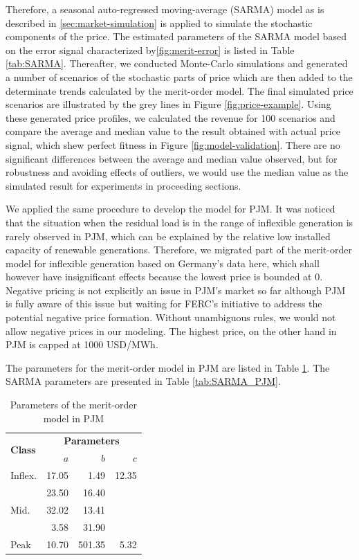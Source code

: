 Therefore, a seasonal auto-regressed moving-average (SARMA) model as is described in \ref{sec:market-simulation} is applied to simulate the stochastic components of the price. The estimated parameters of the SARMA model based on the error signal characterized by\ref{fig:merit-error} is listed in Table \ref{tab:SARMA}. Thereafter, we conducted Monte-Carlo simulations and generated a number of scenarios of the stochastic parts of price which are then added to the determinate trends calculated by the merit-order model. The final simulated price scenarios are illustrated by the grey lines in Figure \ref{fig:price-example}. Using these generated price profiles, we calculated the revenue for 100 scenarios and compare the average and median value to the result obtained with actual price signal, which shew perfect fitness in Figure \ref{fig:model-validation}. There are no significant differences between the average and median value observed, but for robustness and avoiding effects of outliers, we would use the median value as the simulated result for experiments in proceeding sections.

We applied the same procedure to develop the model for PJM. It was noticed that the situation when the residual load is in the range of inflexible generation is rarely observed in PJM, which can be explained by the relative low installed capacity of renewable generations. Therefore, we migrated part of the merit-order model for inflexible generation based on Germany's data here, which shall however have insignificant effects because the lowest price is bounded at 0. Negative pricing is not explicitly an issue in PJM's market so far although PJM is fully aware of this issue but waiting for FERC's initiative to address the potential negative price formation\cite{PJM_price_limit_1}. Without unambiguous rules, we would not allow negative prices in our modeling. The highest price, on the other hand in PJM is capped at 1000 USD/MWh\cite{PJM_price_limit}. 

The parameters for the merit-order model in PJM are listed in Table \ref{tab:merit_pjm}. The SARMA parameters are presented in Table \ref{tab:SARMA_PJM}.

\begin{table}[h!]
	\centering
	\begin{tabular}{l  r r r}
		\hline
		\multirow{2}{*}{\textbf{Class}} & \multicolumn{3}{c}{\textbf{Parameters}}\\
		& $a$ & $b$ & $c$\\
		\hline
		Inflex. & 17.05 & 1.49 & 12.35 \\
		\multirow{3}{*}{Mid.} & 23.50 & 16.40 & \\
		\multirow{3}{*}{} & 32.02 & 13.41 & \\
		\multirow{3}{*}{} & 3.58 & 31.90 & \\
		Peak & 10.70 & 501.35 & 5.32 \\
		\hline
	\end{tabular}
	\caption{Parameters of the merit-order model in PJM}\label{tab:merit_pjm}
\end{table}

